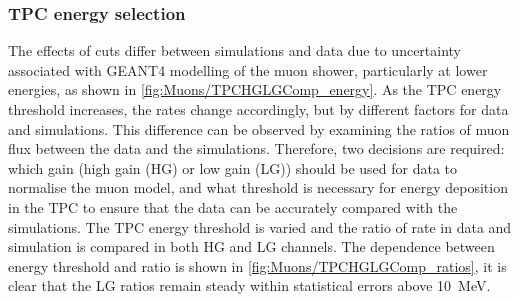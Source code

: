 \subsubsection{TPC energy selection}\label{sec:Muons/TPCEnergySelection}
The effects of cuts differ between simulations and data due to uncertainty associated with GEANT4 modelling of the muon shower, particularly at lower energies, as shown in \autoref{fig:Muons/TPCHGLGComp_energy}. As the TPC energy threshold increases, the rates change accordingly, but by different factors for data and simulations. This difference can be observed by examining the ratios of muon flux between the data and the simulations. Therefore, two decisions are required: which gain (high gain (HG) or low gain (LG)) should be used for data to normalise the muon model, and what threshold is necessary for energy deposition in the TPC to ensure that the data can be accurately compared with the simulations. The TPC energy threshold is varied and the ratio of rate in data and simulation is compared in both HG and LG channels. The dependence between energy threshold and ratio is shown in \autoref{fig:Muons/TPCHGLGComp_ratios}, it is clear that the LG ratios remain steady within statistical errors above 10~MeV.
